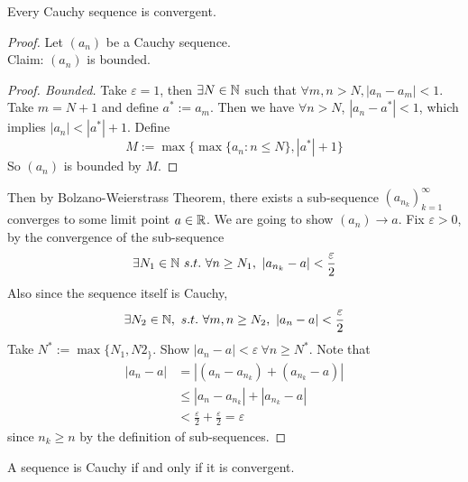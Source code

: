 \documentclass[11pt]{article}
\begin{document}
        \begin{theorem}
            Every Cauchy sequence is convergent.
        \end{theorem}
        
        \begin{proof}
            Let $(a_n)$ be a Cauchy sequence. \\
            Claim: $(a_n)$ is bounded.
            \begin{proof}[Proof. Bounded]
                Take $\varepsilon=1$, then $\exists N \in \mathbb{N}$ such that $\forall m, n > N, |a_n - a_m| < 1$. Take $m = N+1$ and define $a^* := a_m$. Then we have $\forall n > N$, $|a_n - a^*| < 1$, which implies $|a_n| < |a^*| + 1$. Define 
                \begin{equation}
                    M := \max\{
                        \max\{a_n: n \leq N\}, |a^*| + 1
                    \}
                \end{equation}
                So $(a_n)$ is bounded by $M$.
            \end{proof}
            Then by Bolzano-Weierstrass Theorem, there exists a sub-sequence $(a_{n_k})_{k=1}^\infty$ converges to some limit point $a \in \mathbb{R}$. We are going to show $(a_n) \to a$. Fix $\varepsilon>0$, by the convergence of the sub-sequence
            \begin{equation}
                \exists N_1 \in \N\ s.t.\ \forall n \geq N_1,\ |a_{n_k} - a| < \frac{\varepsilon}{2}
            \end{equation}
            Also since the sequence itself is Cauchy,
            \begin{equation}
                \exists N_2 \in \mathbb{N},\ s.t.\ \forall m, n \geq N_2,\ |a_n - a| < \frac{\varepsilon}{2}
            \end{equation}
            Take $N^* := \max\{N_1, N2_\}$. Show $|a_n - a| < \varepsilon\ \forall n \geq N^*$. Note that 
            \begin{align}
                |a_n - a| &= |(a_n - a_{n_k}) + (a_{n_k} - a)| \\
                &\leq |a_n - a_{n_k}| + |a_{n_k} - a| \\
                &<\frac{\varepsilon}{2} + \frac{\varepsilon}{2} = \varepsilon
            \end{align}
            since $n_k \geq n$ by the definition of sub-sequences.
        \end{proof}
    
        \begin{corollary}
            A sequence is Cauchy if and only if it is convergent.
        \end{corollary}
        
\end{document}

